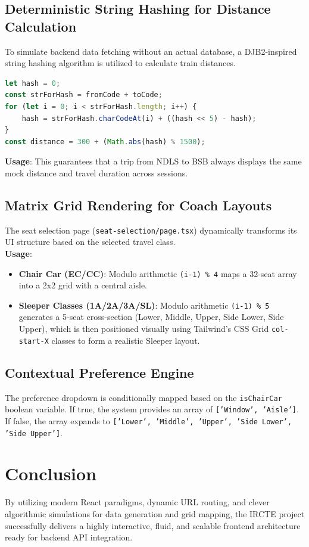 \documentclass[12pt, a4paper]{article}
\begin{document}
\subsection{Deterministic String Hashing for Distance Calculation}
To simulate backend data fetching without an actual database, a DJB2-inspired string hashing algorithm is utilized to calculate train distances.
\begin{lstlisting}[language=JavaScript, caption=Distance Hashing Algorithm]
let hash = 0;
const strForHash = fromCode + toCode;
for (let i = 0; i < strForHash.length; i++) {
    hash = strForHash.charCodeAt(i) + ((hash << 5) - hash);
}
const distance = 300 + (Math.abs(hash) % 1500);
\end{lstlisting}
\textbf{Usage}: This guarantees that a trip from NDLS to BSB always displays the same mock distance and travel duration across sessions.

\subsection{Matrix Grid Rendering for Coach Layouts}
The seat selection page (\texttt{seat-selection/page.tsx}) dynamically transforms its UI structure based on the selected travel class.
\\
\textbf{Usage}: 
\begin{itemize}
    \item \textbf{Chair Car (EC/CC)}: Modulo arithmetic \texttt{(i-1) \% 4} maps a 32-seat array into a 2x2 grid with a central aisle.
    \item \textbf{Sleeper Classes (1A/2A/3A/SL)}: Modulo arithmetic \texttt{(i-1) \% 5} generates a 5-seat cross-section (Lower, Middle, Upper, Side Lower, Side Upper), which is then positioned visually using Tailwind's CSS Grid \texttt{col-start-X} classes to form a realistic Sleeper layout.
\end{itemize}

\subsection{Contextual Preference Engine}
The preference dropdown is conditionally mapped based on the \texttt{isChairCar} boolean variable. If true, the system provides an array of \texttt{['Window', 'Aisle']}. If false, the array expands to \texttt{['Lower', 'Middle', 'Upper', 'Side Lower', 'Side Upper']}.

\section{Conclusion}
By utilizing modern React paradigms, dynamic URL routing, and clever algorithmic simulations for data generation and grid mapping, the IRCTE project successfully delivers a highly interactive, fluid, and scalable frontend architecture ready for backend API integration.
\end{document}
